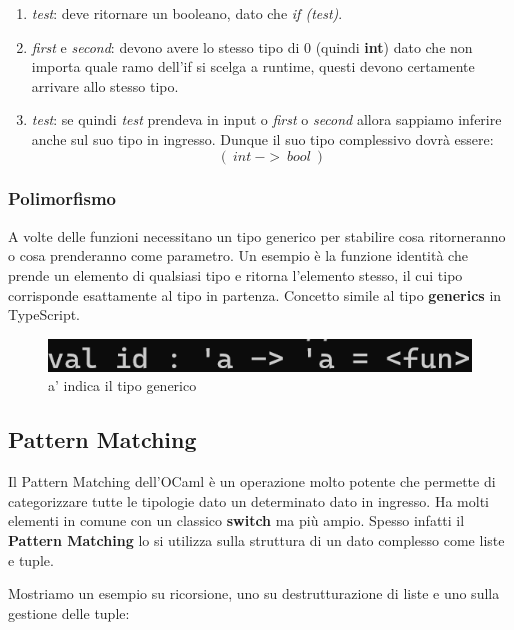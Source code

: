 \documentclass{article}
\begin{document}
\begin{enumerate}
    \item \textit{test}: deve ritornare un booleano, dato che \textit{if (test)}.
    \item \textit{first} e \textit{second}: devono avere lo stesso tipo di $0$ (quindi \textbf{int}) dato che non importa quale ramo dell'if si scelga a runtime, questi devono certamente arrivare allo stesso tipo.
    \item \textit{test}: se quindi \textit{test} prendeva in input o \textit{first} o \textit{second} allora sappiamo inferire anche sul suo tipo in ingresso. Dunque il suo tipo complessivo dovrà essere:
    \[ (\: int \: -> \: bool \:) \]
\end{enumerate}

\vspace*{20px}

\subsubsection{Polimorfismo} A volte delle funzioni necessitano un tipo generico per stabilire cosa ritorneranno o cosa prenderanno come parametro. Un esempio è la funzione identità che prende un elemento di qualsiasi tipo e ritorna l'elemento stesso, il cui tipo corrisponde esattamente al tipo in partenza. Concetto simile al tipo \textbf{generics} in TypeScript.

\begin{figure}[htbp]
    \center
    \includegraphics[scale=0.4]{img/polimorfismo.png}
    \caption{a' indica il tipo generico}
\end{figure}

\newpage

\subsection{Pattern Matching}

Il Pattern Matching dell'OCaml è un operazione molto potente che permette di categorizzare tutte le tipologie dato un determinato dato in ingresso. Ha molti elementi in comune con un classico \textbf{switch} ma più ampio. Spesso infatti il \textbf{Pattern Matching} lo si utilizza sulla struttura di un dato complesso come liste e tuple.

Mostriamo un esempio su ricorsione, uno su destrutturazione di liste e uno sulla gestione delle tuple:
\end{document}
